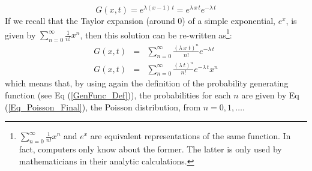 \begin{equation}
    G(x, t)= e^{\lambda(x-1)\,t} = e^{\lambda\,x\,t} e^{-\lambda\,t}
\end{equation}
If we recall that the Taylor expansion (around 0) of a simple exponential, $e^x$, is given by $\sum\limits_{n=0}^{\infty} \frac{1}{n!} x^n$, then this solution can be re-written as\footnote{$\sum\limits_{n=0}^{\infty} \frac{1}{n!} x^n$ and $e^x$ are equivalent representations of the same function. In fact, computers only know about the former. The latter is only used by mathematicians in their analytic calculations.}:
\begin{eqnarray}
    G(x, t) &=& \sum\limits_{n=0}^{\infty} \frac{(\lambda\,x\,\,t)^n}{n!} e^{-\lambda\,t} \nonumber \\
    G(x, t) &=& \sum\limits_{n=0}^{\infty} \frac{(\lambda\,t)^n}{n!} e^{-\lambda\,t} x^n 
\end{eqnarray}
which means that, by using again the definition of the probability generating function (see Eq (\ref{GenFunc_Def})), the probabilities for each $n$ are given by Eq (\ref{Eq_Poisson_Final}), the Poisson distribution, from $n=0,1, \dots$.

